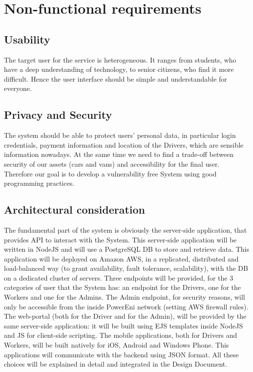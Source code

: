 \section{Non-functional requirements}

\subsection{Usability}
The target user for the service is heterogeneous. It ranges from students, who have a deep understanding of technology, to senior citizens, who find it more difficult. Hence the user interface should be simple and understandable for everyone. \\

\subsection{Privacy and Security}
The system should be able to protect users' personal data, in particular login credentials, payment information and location of the Drivers, which are sensible information nowadays. At the same time we need to find a trade-off between security of our assets (cars and vans) and accessibility for the final user. Therefore our goal is to develop a vulnerability free System using good programming practices. \\

\subsection{Architectural consideration}
The fundamental part of the system is obviously the server-side application, that provides API to interact with the System. 
This server-side application will be written in NodeJS and will use a PostgreSQL DB to store and retrieve data. This application will be deployed on Amazon AWS, in a replicated, distributed and load-balanced way (to grant availability, fault tolerance, scalability), with the DB on a dedicated cluster of servers. 
Three endpoints will be provided, for the 3 categories of user that the System has: an endpoint for the Drivers, one for the Workers and one for the Admins. The Admin endpoint, for security reasons, will only be accessible from the inside PowerEni network (setting AWS firewall rules). 
The web-portal (both for the Driver and for the Admin), will be provided by the same server-side application: it will be built using EJS templates inside NodeJS and JS for client-side scripting. 
The mobile applications, both for Drivers and Workers, will be built natively for iOS, Android and Windows Phone. This applications will communicate with the backend using JSON format. All these choices will be explained in detail and integrated in the Design Document.\\

